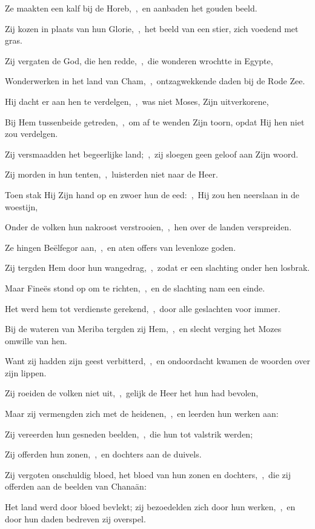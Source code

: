 \documentclass[12pt,twoside,a5paper]{article}
\begin{document}
\begin{halfparskip}
  Ze maakten een kalf bij de Horeb,~\sep\ en aanbaden het gouden beeld.

  Zij kozen in plaats van hun Glorie,~\sep\ het beeld van een stier, zich voedend met gras.

  Zij vergaten de God, die hen redde,~\sep\ die wonderen wrochtte in Egypte,

  Wonderwerken in het land van Cham,~\sep\ ontzagwekkende daden bij de Rode Zee.

  Hij dacht er aan hen te verdelgen,~\sep\ was niet Moses, Zijn uitverkorene,

  Bij Hem tussenbeide getreden,~\sep\ om af te wenden Zijn toorn, opdat Hij hen niet zou verdelgen.

  Zij versmaadden het begeerlijke land;~\sep\ zij sloegen geen geloof aan Zijn woord.

  Zij morden in hun tenten,~\sep\ luisterden niet naar de Heer.

  Toen stak Hij Zijn hand op en zwoer hun de eed:~\sep\ Hij zou hen neerslaan in de woestijn,

  Onder de volken hun nakroost verstrooien,~\sep\ hen over de landen verspreiden.

  Ze hingen Beëlfegor aan,~\sep\ en aten offers van levenloze goden.

  Zij tergden Hem door hun wangedrag,~\sep\ zodat er een slachting onder hen losbrak.

  Maar Fineës stond op om te richten,~\sep\ en de slachting nam een einde.

  Het werd hem tot verdienste gerekend,~\sep\ door alle geslachten voor immer.

  Bij de wateren van Meriba tergden zij Hem,~\sep\ en slecht verging het Mozes omwille van hen.

  Want zij hadden zijn geest verbitterd,~\sep\ en ondoordacht kwamen de woorden over zijn lippen.

  Zij roeiden de volken niet uit,~\sep\ gelijk de Heer het hun had bevolen,

  Maar zij vermengden zich met de heidenen,~\sep\ en leerden hun werken aan:

  Zij vereerden hun gesneden beelden,~\sep\ die hun tot valstrik werden;

  Zij offerden hun zonen,~\sep\ en dochters aan de duivels.

  Zij vergoten onschuldig bloed, het bloed van hun zonen en dochters,~\sep\ die zij offerden aan de beelden van Chanaän:

  Het land werd door bloed bevlekt; zij bezoedelden zich door hun werken,~\sep\ en door hun daden bedreven zij overspel.


\end{halfparskip}
\end{document}
